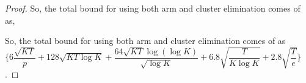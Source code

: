 \begin{proof}
	So, the total bound for using both arm and cluster elimination comes of as,
	
	
	

	So, the total bound for using both arm and cluster elimination comes of as $\bigg\lbrace 6\dfrac{\sqrt{KT}}{p} + 128\sqrt{KT\log K} + \dfrac{64\sqrt{KT}\log{(\log K)}}{\sqrt{\log K}} + 6.8\sqrt{\dfrac{T}{K\log K}} + 2.8\sqrt{\dfrac{T}{e}}\bigg\rbrace$.
\end{proof}

%
%
%
%



